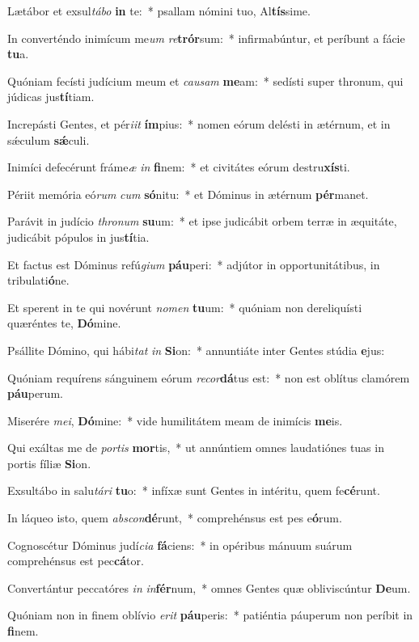 \item Lætábor et exsul\textit{tá}\textit{bo} \textbf{in} te:~* psallam nómini tuo, Al\textbf{tís}sime.
\item In converténdo inimícum me\textit{um} \textit{re}\textbf{trór}sum:~* infirmabúntur, et períbunt a fácie \textbf{tu}a.
\item Quóniam fecísti judícium meum et \textit{cau}\textit{sam} \textbf{me}am:~* sedísti super thronum, qui júdicas jus\textbf{tí}tiam.
\item Increpásti Gentes, et pér\textit{i}\textit{it} \textbf{ím}pius:~* nomen eórum delésti in ætérnum, et in sǽculum \textbf{sǽ}culi.
\item Inimíci defecérunt fráme\textit{æ} \textit{in} \textbf{fi}nem:~* et civitátes eórum destru\textbf{xís}ti.
\item Périit memória eó\textit{rum} \textit{cum} \textbf{só}nitu:~* et Dóminus in ætérnum \textbf{pér}manet.
\item Parávit in judício \textit{thro}\textit{num} \textbf{su}um:~* et ipse judicábit orbem terræ in æquitáte, judicábit pópulos in jus\textbf{tí}tia.
\item Et factus est Dóminus refú\textit{gi}\textit{um} \textbf{páu}peri:~* adjútor in opportunitátibus, in tribulati\textbf{ó}ne.
\item Et sperent in te qui novérunt \textit{no}\textit{men} \textbf{tu}um:~* quóniam non dereliquísti quæréntes te, \textbf{Dó}mine.
\item Psállite Dómino, qui hábi\textit{tat} \textit{in} \textbf{Si}on:~* annuntiáte inter Gentes stúdia \textbf{e}jus:
\item Quóniam requírens sánguinem eórum \textit{re}\textit{cor}\textbf{dá}tus est:~* non est oblítus clamórem \textbf{páu}perum.
\item Miserére \textit{me}\textit{i}, \textbf{Dó}mine:~* vide humilitátem meam de inimícis \textbf{me}is.
\item Qui exáltas me de \textit{por}\textit{tis} \textbf{mor}tis,~* ut annúntiem omnes laudatiónes tuas in portis fíliæ \textbf{Si}on.
\item Exsultábo in salu\textit{tá}\textit{ri} \textbf{tu}o:~* infíxæ sunt Gentes in intéritu, quem fe\textbf{cé}runt.
\item In láqueo isto, quem \textit{abs}\textit{con}\textbf{dé}runt,~* comprehénsus est pes e\textbf{ó}rum.
\item Cognoscétur Dóminus judí\textit{ci}\textit{a} \textbf{fá}ciens:~* in opéribus mánuum suárum comprehénsus est pec\textbf{cá}tor.
\item Convertántur peccatóres \textit{in} \textit{in}\textbf{fér}num,~* omnes Gentes quæ obliviscúntur \textbf{De}um.
\item Quóniam non in finem oblívio \textit{e}\textit{rit} \textbf{páu}peris:~* patiéntia páuperum non períbit in \textbf{fi}nem.
